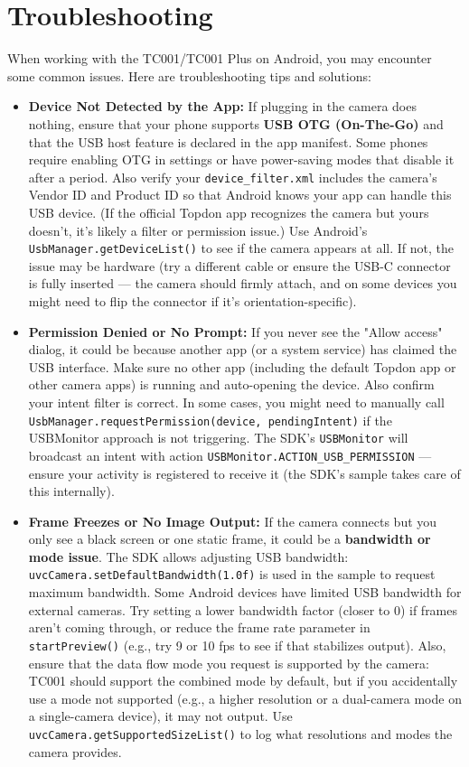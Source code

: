 {\section{Troubleshooting}

When working with the TC001/TC001 Plus on Android, you may encounter
some common issues. Here are troubleshooting tips and solutions:

\begin{itemize}
\item \textbf{Device Not Detected by the App:} If plugging in the camera does
  nothing, ensure that your phone supports \textbf{USB OTG (On-The-Go)} and
  that the USB host feature is declared in the app manifest. Some phones
  require enabling OTG in settings or have power-saving modes that
  disable it after a period. Also verify your \texttt{device_filter.xml}
  includes the camera's Vendor ID and Product ID so that Android knows
  your app can handle this USB device. (If the official Topdon app
  recognizes the camera but yours doesn't, it's likely a filter or
  permission issue.) Use Android's \texttt{UsbManager.getDeviceList()} to see
  if the camera appears at all. If not, the issue may be hardware (try a
  different cable or ensure the USB-C connector is fully inserted --- the
  camera should firmly attach, and on some devices you might need to
  flip the connector if it's orientation-specific).

\item \textbf{Permission Denied or No Prompt:} If you never see the "Allow
  access" dialog, it could be because another app (or a system service)
  has claimed the USB interface. Make sure no other app (including the
  default Topdon app or other camera apps) is running and auto-opening
  the device. Also confirm your intent filter is correct. In some cases,
  you might need to manually call
  \texttt{UsbManager.requestPermission(device, pendingIntent)} if the
  USBMonitor approach is not triggering. The SDK's \texttt{USBMonitor} will
  broadcast an intent with action \texttt{USBMonitor.ACTION_USB_PERMISSION} ---
  ensure your activity is registered to receive it (the SDK's sample
  takes care of this internally).

\item \textbf{Frame Freezes or No Image Output:} If the camera connects but you
  only see a black screen or one static frame, it could be a \textbf{bandwidth
  or mode issue}. The SDK allows adjusting USB bandwidth:
  \texttt{uvcCamera.setDefaultBandwidth(1.0f)} is used in the sample to request
  maximum
  bandwidth\cite{ref39}.
  Some Android devices have limited USB bandwidth for external cameras.
  Try setting a lower bandwidth factor (closer to 0) if frames aren't
  coming through, or reduce the frame rate parameter in \texttt{startPreview()}
  (e.g., try 9 or 10 fps to see if that stabilizes output). Also, ensure
  that the data flow mode you request is supported by the camera: TC001
  should support the combined mode by default, but if you accidentally
  use a mode not supported (e.g., a higher resolution or a dual-camera
  mode on a single-camera device), it may not output. Use
  \texttt{uvcCamera.getSupportedSizeList()} to log what resolutions and modes
  the camera
  provides\cite{ref40}.


\end{itemize}}
